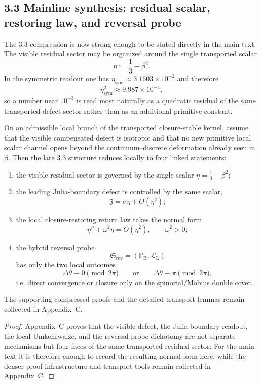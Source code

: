 \subsection*{3.3 Mainline synthesis: residual scalar, restoring law, and reversal probe}
The 3.3 compression is now strong enough to be stated directly in the main text. The visible residual sector may be organized around the single transported scalar
\[
  \eta:=\frac13-\beta^2.
\]
In the symmetric readout one has $\eta_{\mathrm{sym}}\approx 3.1603\times10^{-2}$ and therefore
\[
  \eta_{\mathrm{sym}}^2\approx 9.987\times10^{-4},
\]
so a number near $10^{-3}$ is read most naturally as a quadratic residual of the same transported defect sector rather than as an additional primitive constant.

\begin{theorem}
\label{thm:mainline-332}
On an admissible local branch of the transported closure-stable kernel, assume that the visible compensated defect is isotropic and that no new primitive local scalar channel opens beyond the continuum--discrete deformation already seen in $\beta$. Then the late 3.3 structure reduces locally to four linked statements:
\begin{enumerate}[label=(\roman*)]
  \item the visible residual sector is governed by the single scalar $\eta=\frac13-\beta^2$;
  \item the leading Julia-boundary defect is controlled by the same scalar,
  \[
    \mathfrak J = c\,\eta + O(\eta^2);
  \]
  \item the local closure-restoring return law takes the normal form
  \[
    \eta''+\omega^2\eta = O(\eta^2), \qquad \omega^2>0;
  \]
  \item the hybrid reversal probe
  \[
    \mathfrak S_{\mathrm{rev}}=(\mathbb P_{\mathrm B},\mathcal L_{\mathrm L})
  \]
  has only the two local outcomes
  \[
    \Delta\theta\equiv 0 \pmod{2\pi}
    \qquad\text{or}\qquad
    \Delta\theta\equiv \pi \pmod{2\pi},
  \]
  i.e. direct convergence or closure only on the spinorial/M\"obius double cover.
\end{enumerate}
The supporting compressed proofs and the detailed transport lemmas remain collected in Appendix~C.
\end{theorem}

\begin{proof}
Appendix~C proves that the visible defect, the Julia-boundary readout, the local Umkehrwalze, and the reversal-probe dichotomy are not separate mechanisms but four faces of the same transported residual sector. For the main text it is therefore enough to record the resulting normal form here, while the denser proof infrastructure and transport tools remain collected in Appendix~C.
\end{proof}

